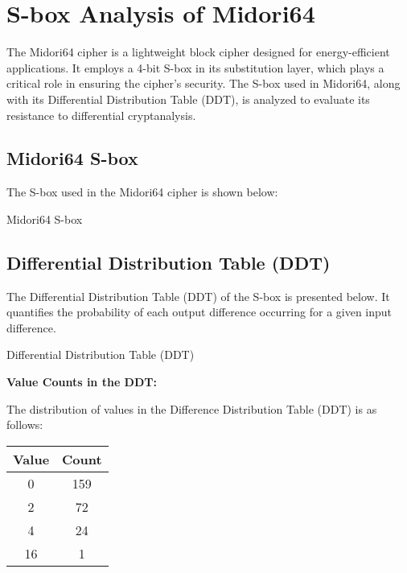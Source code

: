 \documentclass[10pt, a4paper]{article}
\begin{document}
\newpage
\section*{S-box Analysis of Midori64}

\noindent The Midori64 cipher is a lightweight block cipher designed for
energy-efficient applications. It employs a 4-bit S-box in its substitution
layer, which plays a critical role in ensuring the cipher's security. The S-box
used in Midori64, along with its Differential Distribution Table (DDT), is
analyzed to evaluate its resistance to differential cryptanalysis.

\subsection*{Midori64 S-box}
\noindent The S-box used in the Midori64 cipher is shown below:

\begin{table}[h!]
	\centering
	\setlength{\tabcolsep}{8pt}
	\renewcommand{\arraystretch}{1.5}
	\hspace{2pt}
	\caption{Midori64 S-box}
\end{table}

\subsection*{Differential Distribution Table (DDT)}
\noindent The Differential Distribution Table (DDT) of the S-box is presented
below. It quantifies the probability of each output difference occurring for a
given input difference.

\begin{table}[h!]
	\centering
	\label{tab:ddt}
	\caption{Differential Distribution Table (DDT)}
	\setlength{\tabcolsep}{10pt}
	\hspace{2pt}
\end{table}

\newpage
\textbf{Value Counts in the DDT:}

The distribution of values in the Difference Distribution Table (DDT) is as follows:
\begin{table}[h!]
	\centering
	\begin{tabular}{|c|c|}
		\hline
		\textbf{Value} & \textbf{Count} \\ \hline
		0              & 159            \\ \hline
		2              & 72             \\ \hline
		4              & 24             \\ \hline
		16             & 1              \\ \hline
	\end{tabular}
\end{table}
\end{document}
